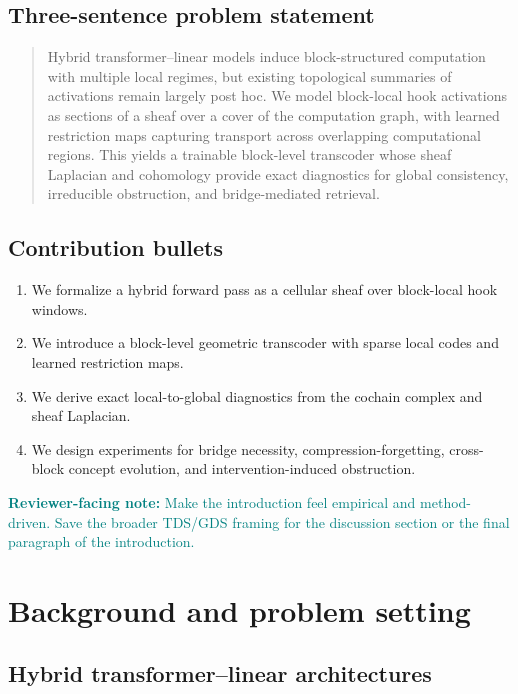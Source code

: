 \documentclass[11pt]{article}
\newcommand{\reviewer}[1]{\textcolor{teal}{\textbf{Reviewer-facing note:} #1}}
\begin{document}
\subsection*{Three-sentence problem statement}
\begin{quote}
Hybrid transformer--linear models induce block-structured computation with multiple local regimes, but existing topological summaries of activations remain largely post hoc. We model block-local hook activations as sections of a sheaf over a cover of the computation graph, with learned restriction maps capturing transport across overlapping computational regions. This yields a trainable block-level transcoder whose sheaf Laplacian and cohomology provide exact diagnostics for global consistency, irreducible obstruction, and bridge-mediated retrieval.
\end{quote}

\subsection*{Contribution bullets}
\begin{enumerate}[leftmargin=1.5em]
    \item We formalize a hybrid forward pass as a cellular sheaf over block-local hook windows.
    \item We introduce a block-level geometric transcoder with sparse local codes and learned restriction maps.
    \item We derive exact local-to-global diagnostics from the cochain complex and sheaf Laplacian.
    \item We design experiments for bridge necessity, compression-forgetting, cross-block concept evolution, and intervention-induced obstruction.
\end{enumerate}

\reviewer{Make the introduction feel empirical and method-driven. Save the broader TDS/GDS framing for the discussion section or the final paragraph of the introduction.}

\section{Background and problem setting}

\subsection{Hybrid transformer--linear architectures}
\end{document}
